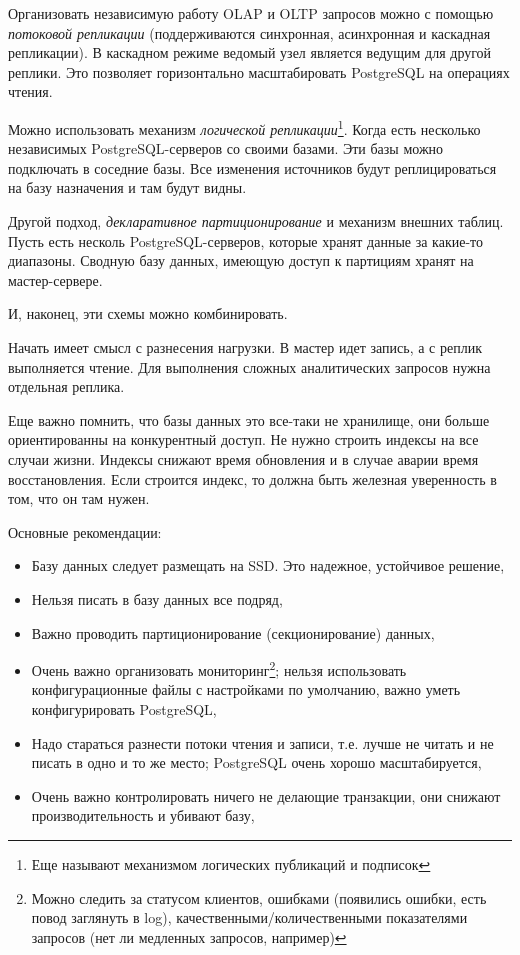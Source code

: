 \documentclass[%
	11pt,
	a4paper,
	utf8,
		]{article}
\begin{document}
Организовать независимую работу OLAP и OLTP запросов можно с помощью \emph{потоковой репликации} (поддерживаются синхронная, асинхронная и каскадная репликации). В каскадном режиме ведомый узел является ведущим для другой реплики. Это позволяет горизонтально масштабировать PostgreSQL на операциях чтения.

Можно использовать механизм \emph{логической репликации}\footnote{Еще называют механизмом логических публикаций и подписок}. Когда есть несколько независимых PostgreSQL-серверов со своими базами. Эти базы можно подключать в соседние базы. Все изменения источников будут реплицироваться на базу назначения и там будут видны.

Другой подход, \emph{декларативное партиционирование} и механизм внешних таблиц. Пусть есть несколь PostgreSQL-серверов, которые хранят данные за какие-то диапазоны. Сводную базу данных, имеющую доступ к партициям хранят на мастер-сервере.

И, наконец, эти схемы можно комбинировать.

Начать имеет смысл с разнесения нагрузки. В мастер идет запись, а с реплик выполняется чтение. Для выполнения сложных аналитических запросов нужна отдельная реплика.

Еще важно помнить, что базы данных это все-таки не хранилище, они больше ориентированны на конкурентный доступ. Не нужно строить индексы на все случаи жизни. Индексы снижают время обновления и в случае аварии время восстановления. Если строится индекс, то должна быть железная уверенность в том, что он там нужен.


Основные рекомендации:
\begin{itemize}	
	\item Базу данных следует размещать на SSD. Это надежное, устойчивое решение,
	
	\item Нельзя писать в базу данных все подряд,
	
	\item Важно проводить партиционирование (секционирование) данных,
	
	\item Очень важно организовать мониторинг\footnote{Можно следить за статусом клиентов, ошибками (появились ошибки, есть повод заглянуть в log), качественными/количественными показателями запросов (нет ли медленных запросов, например)}; нельзя использовать конфигурационные файлы с настройками по умолчанию, важно уметь конфигурировать PostgreSQL,
	
	\item Надо стараться разнести потоки чтения и записи, т.е. лучше не читать и не писать в одно и то же место; PostgreSQL очень хорошо масштабируется,
	
	\item Очень важно контролировать ничего не делающие транзакции, они снижают производительность и убивают базу,
	
	
\end{itemize}
 
\end{document}
